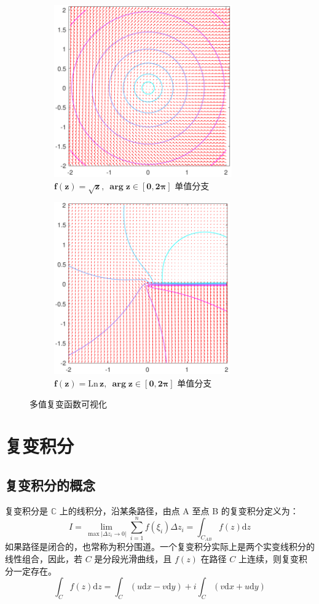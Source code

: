 \documentclass[UTF8]{report}
\def\Ln{\mathrm{Ln\,}}
\def\C{\mathbb{C}}
\theoremstyle{MyLineTheoremStyle} %
\theoremstyle{MyBlockTheoremStyle} %
\theoremstyle{MySubsubsectionStyle} %
\begin{document}
\begin{figure}[H]\centering
    \begin{subfigure}[t]{0.49\textwidth}\centering
        \includegraphics[height=210pt]{assets/1,2/sqrt z.pdf}
        \caption{ $\boldsymbol{f(z) = \sqrt{z} },\ \boldsymbol{\arg z \in [0, 2\pi]}$ 单值分支 }
    \end{subfigure}\begin{subfigure}[t]{0.49\textwidth}\centering
        \includegraphics[height=210pt]{assets/1,2/ln z.pdf}
        \caption{ $\boldsymbol{f(z) = \Ln z},\ \boldsymbol{\arg z \in [0, 2\pi]}$ 单值分支  }
    \end{subfigure}
    \caption{ 多值复变函数可视化 }\label{可视化4}
\end{figure}


\chapter{复变积分}

\section{复变积分的概念}
复变积分是 $\C$ 上的线积分，沿某条路径，由点 A 至点 B 的复变积分定义为：
\begin{equation}
I = \lim_{\max | \Delta z_i \to 0|}\sum_{i=1}^{n} f(\xi_i)\Delta z_i = \int_{C_{AB}} f(z) \mathrm{d}z
\end{equation}
如果路径是闭合的，也常称为积分围道。一个复变积分实际上是两个实变线积分的线性组合，因此，若 $C$ 是分段光滑曲线，且 $f(z)$ 在路径 $C$ 上连续，则复变积分一定存在。
\begin{equation}
\int_{C}f(z) \mathrm{d}z = \int_{C}(u \mathrm{d}x - v \mathrm{d}y) + i \int_{C}( v \mathrm{d}x + u \mathrm{d}y)
\end{equation}
\end{document}
